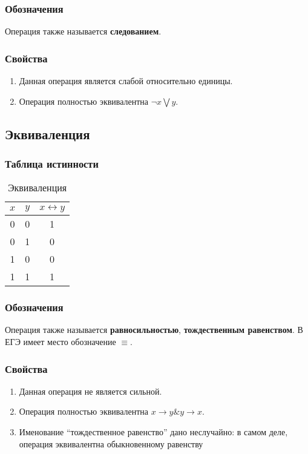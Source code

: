 \subsubsection{Обозначения}
Операция также называется \textbf{следованием}.

\subsubsection{Свойства}
\begin{enumerate}
	\item Данная операция является слабой относительно единицы.
	\item Операция полностью эквивалентна $\neg x \bigvee y$.
\end{enumerate}
\subsection{Эквиваленция}
\subsubsection{Таблица истинности}
\begin{table}[H]
	\begin{center}
		\begin{tabular}{|c|c|c|}
			\hline
			$x$ & $y$ & $x\leftrightarrow y$\\
			\hline
			0 & 0 & 1\\
			\hline
			0 & 1 & 0\\
			\hline
			1 & 0 & 0\\
			\hline
			1 & 1 & 1\\
			\hline
		\end{tabular}
		\caption{Эквиваленция}
	\end{center}
\end{table}

\subsubsection{Обозначения}
Операция также называется \textbf{равносильностью}, \textbf{тождественным равенством}. В ЕГЭ имеет место обозначение $\equiv$.

\subsubsection{Свойства}
\begin{enumerate}
	\item Данная операция не является сильной.
	\item Операция полностью эквивалентна $x \rightarrow y \& y \rightarrow x$.
	\item Именование ``тождественное равенство'' дано неслучайно: в самом деле, операция эквивалентна обыкновенному равенству
	
\end{enumerate}

